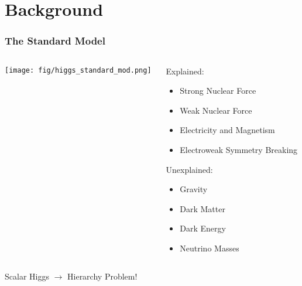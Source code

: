 

\section{Background}
\addtocounter{framenumber}{-1}

\begin{frame}
  \frametitle{The Standard Model}
  \begin{columns}[T]
    \begin{column}{.6\textwidth}
      \texttt{[image: fig/higgs\_standard\_mod.png]}
    \end{column}
    \begin{column}{.4\textwidth}
      Explained:
      \begin{itemize}
        \item Strong Nuclear Force
        \item Weak Nuclear Force
        \item Electricity and Magnetism
        \item Electroweak Symmetry Breaking
      \end{itemize}
      Unexplained:
      \begin{itemize}
        \item Gravity
        \item Dark Matter
        \item Dark Energy
        \item Neutrino Masses
      \end{itemize}
    \end{column}
  \end{columns}
  Scalar Higgs $\rightarrow$ Hierarchy Problem!
\end{frame}


